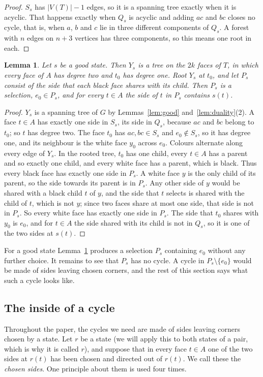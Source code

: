 \documentclass[10pt]{amsart}
\numberwithin{equation}{section}
\newtheorem{lemma}[equation]{Lemma}
\theoremstyle{definition}
\theoremstyle{remark}
\newcommand{\T}{T}
\begin{document}
\begin{proof}
$S_s$ has $|V(\T)|-1$ edges, so it is a spanning tree exactly when it is acyclic.
That happens exactly when $Q_s$ is acyclic and adding $ac$ and $bc$ closes no cycle, that is, when $a$, $b$ and $c$ lie in three different components of $Q_s$.
A forest with $n$ edges on $n+3$ vertices has three components, so this means one root in each.
\end{proof}

\begin{lemma}\label{lem:Y}
Let $s$ be a good state.
Then $Y_s$ is a tree on the $2k$ faces of $\T$, in which every face of $A$ has degree two and $t_0$ has degree one.
Root $Y_s$ at $t_0$, and let $P_s$ consist of the side that each black face shares with its child.
Then $P_s$ is a selection, $e_0\in P_s$, and for every $t\in A$ the side of $t$ in $P_s$ contains $s(t)$.
\end{lemma}

\begin{proof}
$Y_s$ is a spanning tree of $G$ by Lemmas~\ref{lem:good} and~\ref{lem:duality}(2).
A face $t\in A$ has exactly one side in $S_s$, its side in $Q_s$, because $ac$ and $bc$ belong to $t_0$; so $t$ has degree two.
The face $t_0$ has $ac,bc\in S_s$ and $e_0\notin S_s$, so it has degree one, and its neighbour is the white face $y_0$ across $e_0$.
Colours alternate along every edge of $Y_s$.
In the rooted tree, $t_0$ has one child, every $t\in A$ has a parent and so exactly one child, and every white face has a parent, which is black.
Thus every black face has exactly one side in $P_s$.
A white face $y$ is the only child of its parent, so the side towards its parent is in $P_s$.
Any other side of $y$ would be shared with a black child $t$ of $y$, and the side that $t$ selects is shared with the child of $t$, which is not $y$; since two faces share at most one side, that side is not in $P_s$.
So every white face has exactly one side in $P_s$.
The side that $t_0$ shares with $y_0$ is $e_0$, and for $t\in A$ the side shared with its child is not in $Q_s$, so it is one of the two sides at $s(t)$.
\end{proof}

For a good state Lemma~\ref{lem:Y} produces a selection $P_s$ containing $e_0$ without any further choice.
It remains to see that $P_s$ has no cycle.
A cycle in $P_s\setminus\{e_0\}$ would be made of sides leaving chosen corners, and the rest of this section says what such a cycle looks like.

\subsection*{The inside of a cycle}
Throughout the paper, the cycles we need are made of sides leaving corners chosen by a state.
Let $r$ be a state (we will apply this to both states of a pair, which is why it is called $r$), and suppose that in every face $t\in A$ one of the two sides at $r(t)$ has been chosen and directed out of $r(t)$.
We call these the \emph{chosen sides}.
One principle about them is used four times.
\end{document}
